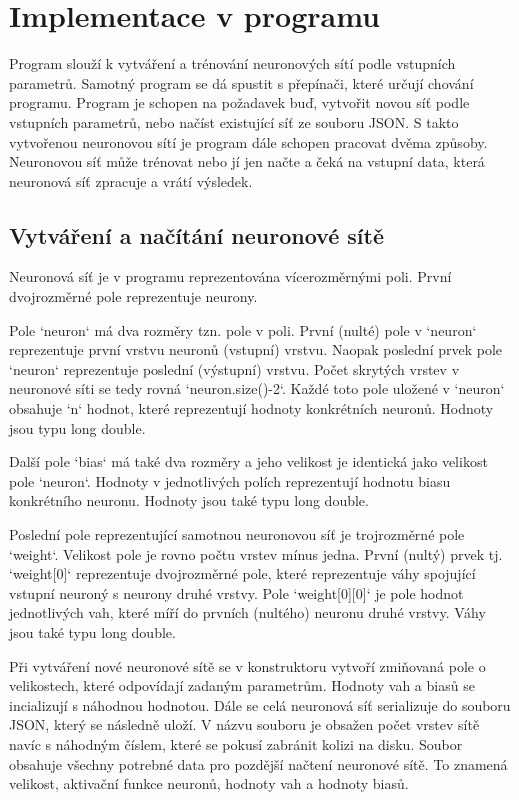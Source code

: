 \section{Implementace v programu}
Program slouží k vytváření a trénování neuronových sítí podle vstupních parametrů.
Samotný program se dá spustit s přepínači, které určují chování programu.
Program je schopen na požadavek buď, vytvořit novou síť podle vstupních parametrů, nebo načíst existující síť ze souboru JSON.
S takto vytvořenou neuronovou sítí je program dále schopen pracovat dvěma způsoby.
Neuronovou síť může trénovat nebo jí jen načte a čeká na vstupní data, která neuronová síť zpracuje a vrátí výsledek.

\subsection{Vytváření a načítání neuronové sítě}
Neuronová síť je v programu reprezentována vícerozměrnými poli. První dvojrozměrné pole reprezentuje neurony.

Pole `neuron` má dva rozměry tzn. pole v poli.
První (nulté) pole v `neuron` reprezentuje první vrstvu neuronů (vstupní) vrstvu.
Naopak poslední prvek pole `neuron` reprezentuje poslední (výstupní) vrstvu.
Počet skrytých vrstev v neuronové síti se tedy rovná `neuron.size()-2`.
Každé toto pole uložené v `neuron` obsahuje `n` hodnot, které reprezentují hodnoty konkrétních neuronů. Hodnoty jsou typu long double.

Další pole `bias` má také dva rozměry a jeho velikost je identická jako velikost pole `neuron`.
Hodnoty v jednotlivých polích reprezentují hodnotu biasu konkrétního neuronu. Hodnoty jsou také typu long double.

Poslední pole reprezentující samotnou neuronovou síť je trojrozměrné pole `weight`. Velikost pole je rovno počtu vrstev mínus jedna.
První (nultý) prvek tj. `weight[0]` reprezentuje dvojrozměrné pole, které reprezentuje váhy spojující vstupní neuroný s neurony druhé vrstvy.
Pole `weight[0][0]` je pole hodnot jednotlivých vah, které míří do prvních (nultého) neuronu druhé vrstvy. Váhy jsou také typu long double.

Při vytváření nové neuronové sítě se v konstruktoru vytvoří zmiňovaná pole o velikostech, které odpovídají zadaným parametrům.
Hodnoty vah a biasů se incializují s náhodnou hodnotou. Dále se celá neuronová síť serializuje do souboru JSON, který se následně uloží.
V názvu souboru je obsažen počet vrstev sítě navíc s náhodným číslem, které se pokusí zabránit kolizi na disku. Soubor obsahuje všechny potrebné data pro pozdější načtení neuronové sítě.
To znamená velikost, aktivační funkce neuronů, hodnoty vah a hodnoty biasů.

